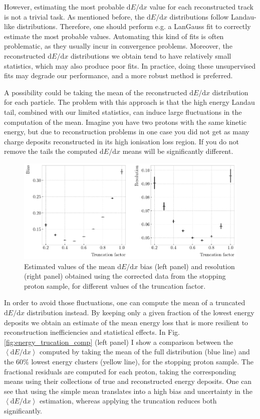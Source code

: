 However, estimating the most probable $\mathrm{d}E/\mathrm{d}x$ value for each reconstructed track is not a trivial task. As mentioned before, the $\mathrm{d}E/\mathrm{d}x$ distributions follow Landau-like distributions. Therefore, one should perform e.g. a LanGauss fit to correctly estimate the most probable values. Automating this kind of fits is often problematic, as they usually incur in convergence problems. Moreover, the reconstructed $\mathrm{d}E/\mathrm{d}x$ distributions we obtain tend to have relatively small statistics, which may also produce poor fits. In practice, doing these unsupervised fits may degrade our performance, and a more robust method is preferred.

A possibility could be taking the mean of the reconstructed $\mathrm{d}E/\mathrm{d}x$ distribution for each particle. The problem with this approach is that the high energy Landau tail, combined with our limited statistics, can induce large fluctuations in the computation of the mean. Imagine you have two protons with the same kinetic energy, but due to reconstruction problems in one case you did not get as many charge deposits reconstructed in its high ionisation loss region. If you do not remove the tails the computed $\mathrm{d}E/\mathrm{d}x$ means will be significantly different.

\begin{figure}[t]
	\centering
	\includegraphics[width=.90\linewidth]{Images/GArSoft_PID/dEdx/reco_dEdx_truncation_opt.pdf}
	\caption{Estimated values of the mean $\mathrm{d}E/\mathrm{d}x$ bias (left panel) and resolution (right panel) obtained using the corrected data from the stopping proton sample, for different values of the truncation factor.}
	\label{fig:energy_trucation_opt}
\end{figure}

In order to avoid those fluctuations, one can compute the mean of a truncated $\mathrm{d}E/\mathrm{d}x$ distribution instead. By keeping only a given fraction of the lowest energy deposits we obtain an estimate of the mean energy loss that is more resilient to reconstruction inefficiencies and statistical effects. In Fig. \ref{fig:energy_trucation_comp} (left panel) I show a comparison between the $\left<\mathrm{d}E/\mathrm{d}x\right>$ computed by taking the mean of the full distribution (blue line) and the $60\%$ lowest energy clusters (yellow line), for the stopping proton sample. The fractional residuals are computed for each proton, taking the corresponding means using their collections of true and reconstructed energy deposits. One can see that using the simple mean translates into a high bias and uncertainty in the $\left<\mathrm{d}E/\mathrm{d}x\right>$ estimation, whereas applying the truncation reduces both significantly.

